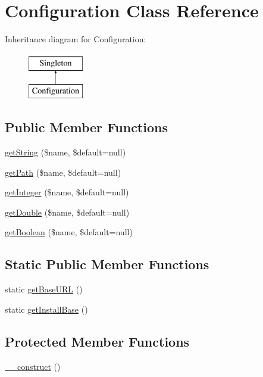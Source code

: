 \hypertarget{classConfiguration}{
\section{Configuration Class Reference}
\label{classConfiguration}
}
Inheritance diagram for Configuration:\begin{figure}[H]
\begin{center}
\leavevmode
\includegraphics[height=2.000000cm]{classConfiguration}
\end{center}
\end{figure}
\subsection*{Public Member Functions}
\begin{DoxyCompactItemize}
\item 
\hyperlink{classConfiguration_af83327cbd2812c84077aa8e92cc1f9b6}{getString} (\$name, \$default=null)
\item 
\hyperlink{classConfiguration_a71e55f600649d58321c039cbb829ea09}{getPath} (\$name, \$default=null)
\item 
\hyperlink{classConfiguration_a7aba0859f79226be3b942e11a1d33738}{getInteger} (\$name, \$default=null)
\item 
\hyperlink{classConfiguration_aadd8e90fd4915c74aabe8e88be9bfe58}{getDouble} (\$name, \$default=null)
\item 
\hyperlink{classConfiguration_a4afcc17b2a14fe90ca873fc7cbc38d16}{getBoolean} (\$name, \$default=null)
\end{DoxyCompactItemize}
\subsection*{Static Public Member Functions}
\begin{DoxyCompactItemize}
\item 
static \hyperlink{classConfiguration_a9a1a49e746b5409d674183da01362444}{getBaseURL} ()
\item 
static \hyperlink{classConfiguration_a6fb14b409e3d73183b90d4e7cb30e605}{getInstallBase} ()
\end{DoxyCompactItemize}
\subsection*{Protected Member Functions}
\begin{DoxyCompactItemize}
\item 
\hyperlink{classConfiguration_a3102d300a65b42bea6794dacd9d7afc9}{\_\-\_\-construct} ()
\end{DoxyCompactItemize}

